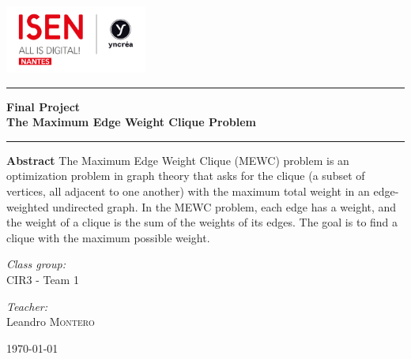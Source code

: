 
\begin{center}
    \includegraphics[width=0.35\textwidth]{image/ISEN.png}
\end{center}

\rule{\linewidth}{0.5mm}

\begin{center}
    \Huge \bf Final Project \\
    \LARGE \bf The Maximum Edge Weight Clique Problem
\end{center}

\rule{\linewidth}{0.5mm}

\vspace{1\baselineskip}

\begin{center}
\end{center}
\large\textbf{Abstract} \newline
The Maximum Edge Weight Clique (MEWC) problem is an optimization problem in
graph theory that asks for the clique (a subset of vertices, all adjacent to
one another) with the maximum total weight in an edge-weighted undirected graph.
In the MEWC problem, each edge has a weight, and the weight of a clique is the
sum of the weights of its edges. The goal is to find a clique with the maximum
possible weight.

\begin{center} \Large
    \emph{Class group:} \\
    CIR3 - Team 1
\end{center}

\begin{center} \Large
    \emph{Teacher:} \\
    Leandro \textsc{Montero}
\end{center}

\vfill

\begin{center} \Large
    \today
\end{center}

\newpage